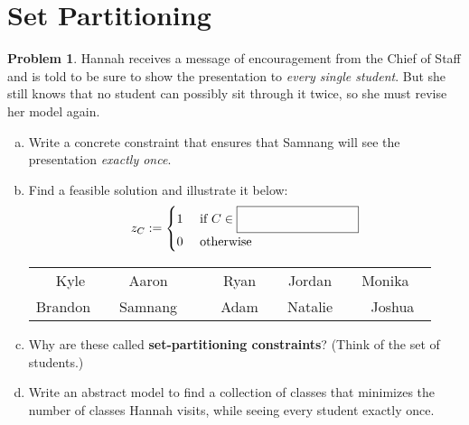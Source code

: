 \documentclass[11pt]{article}
\theoremstyle{definition}
\newtheorem{problem}{Problem}
\newcommand{\answerbox}[3]{%
  \fbox{%
    \begin{minipage}[#1]{#2}
      \hfill\vspace{#3}
    \end{minipage}
  }
}
\newcommand{\wordbox}{\answerbox{c}{1.2in}{.5cm}}
\begin{document}
\section{Set Partitioning}
\begin{problem}
Hannah receives a message of encouragement from the Chief of Staff and is told to be sure to show the presentation to \emph{every single student}.  But she still knows that no student can possibly sit through it twice, so she must revise her model again.  
\begin{enumerate}[a.]
\item Write a concrete constraint that ensures that Samnang will see the presentation \emph{exactly once}.

\vfill
\item Find a feasible solution and illustrate it below:
\[
z_{C} :=
\begin{cases}
1 & \text{ if } C \in \wordbox \\
0 & \text{ otherwise } 
\end{cases}
\]

\begin{tcolorbox}
\begin{center}
\def\arraystretch{1.5}
\setlength{\tabcolsep}{12pt}
\begin{tabular}{ccccc}
Kyle & Aaron~~ & Ryan & Jordan~~ & Monika~~ \\ Brandon~~ & Samnang~~ & ~~Adam~~ & Natalie~~ & Joshua 
\end{tabular}
\end{center}
\end{tcolorbox}
\bigskip

\item Why are these called {\bf set-partitioning constraints}?  (Think of the set of students.)
\vfill
\item  Write an abstract model to find a collection of classes that minimizes the number of classes Hannah visits, while seeing every student exactly once. 
\vfill
\vfill
\end{enumerate}
\end{problem}
\end{document}
